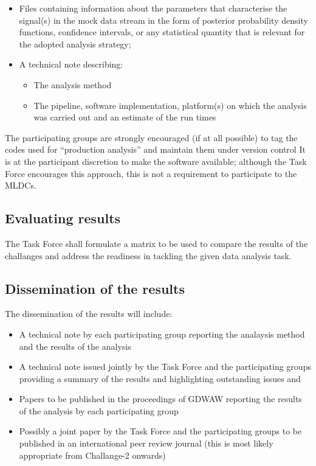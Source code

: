 \documentclass[11pt]{report}
\begin{document}
\begin{itemize}

\item Files containing information about the parameters that characterise the signal(s) in the mock data stream in the form of posterior probability density functions, confidence intervals, or any statistical quantity that is relevant for the adopted analysis strategy;

\item A technical note describing:
\begin{itemize}
\item The analysis method
\item The pipeline, software implementation, platform(s) on which the analysis was carried out and an estimate of the run times
\end{itemize}
\end{itemize}

The participating groups are strongly encouraged (if at all possible) to tag the codes used for ``production analysis'' and maintain them under version control
It is at the participant discretion to make the software available; although the Task Force encourages this approach, this is not a requirement to participate to the MLDCs.

\subsection{Evaluating results}

The Task Force shall formulate a matrix to be used to compare the results of the challanges and address the readiness in tackling the given data analysis task. 

\subsection{Dissemination of the results}

The dissemination of the results will include:
\begin{itemize}

\item A technical note by each participating group reporting the analaysis method and the results of the analysis

\item A technical note issued jointly by the Task Force and the participating groups providing a summary of the results and highlighting outstanding issues and

\item Papers to be published in the proceedings of GDWAW reporting the results of the analysis by each participating group

\item Possibly a joint paper by the Task Force and the participating groups to be published in an international peer review journal (this is most likely appropriate from Challange-2 onwards)

\end{itemize}
\end{document}

